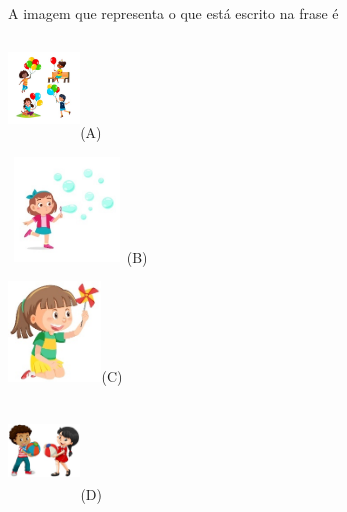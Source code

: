 A imagem que representa o que está escrito na frase é

\begin{escolha}
\item\includegraphics[width=0.75159in,height=1.04531in]{media/image78.jpeg}(A)

\item\includegraphics[width=1.23681in,height=1.10139in]{media/image79.jpeg}(B)

\item\includegraphics[width=0.97361in,height=1.05069in]{media/image80.jpeg}(C)

\item\includegraphics[width=0.75437in,height=1.04404in]{media/image81.jpeg}(D)
\end{escolha}


